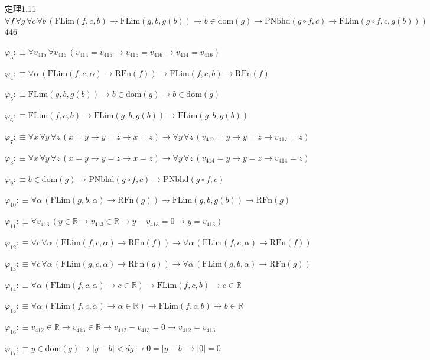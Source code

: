 \begin{fullproof}{定理1.11}{$\forall f\,\forall g\,\forall c\,\forall b\,(\mathrm{FLim}(f,c,b) \to \mathrm{FLim}(g,b,g(b)) \to b \in \mathrm{dom}(g) \to \mathrm{PNbhd}(g \circ f,c) \to \mathrm{FLim}(g \circ f,c,g(b)))$}{446}
\begin{abbrevlist}
\item $\varphi_{3} :\equiv \forall v_{415}\,\forall v_{416}\,(v_{414} = v_{415} \to v_{415} = v_{416} \to v_{414} = v_{416})$
\item $\varphi_{4} :\equiv \forall \alpha\,(\mathrm{FLim}(f,c,\alpha) \to \mathrm{RFn}(f)) \to \mathrm{FLim}(f,c,b) \to \mathrm{RFn}(f)$
\item $\varphi_{5} :\equiv \mathrm{FLim}(g,b,g(b)) \to b \in \mathrm{dom}(g) \to b \in \mathrm{dom}(g)$
\item $\varphi_{6} :\equiv \mathrm{FLim}(f,c,b) \to \mathrm{FLim}(g,b,g(b)) \to \mathrm{FLim}(g,b,g(b))$
\item $\varphi_{7} :\equiv \forall x\,\forall y\,\forall z\,(x = y \to y = z \to x = z) \to \forall y\,\forall z\,(v_{417} = y \to y = z \to v_{417} = z)$
\item $\varphi_{8} :\equiv \forall x\,\forall y\,\forall z\,(x = y \to y = z \to x = z) \to \forall y\,\forall z\,(v_{414} = y \to y = z \to v_{414} = z)$
\item $\varphi_{9} :\equiv b \in \mathrm{dom}(g) \to \mathrm{PNbhd}(g \circ f,c) \to \mathrm{PNbhd}(g \circ f,c)$
\item $\varphi_{10} :\equiv \forall \alpha\,(\mathrm{FLim}(g,b,\alpha) \to \mathrm{RFn}(g)) \to \mathrm{FLim}(g,b,g(b)) \to \mathrm{RFn}(g)$
\item $\varphi_{11} :\equiv \forall v_{413}\,(y \in \mathbb{R} \to v_{413} \in \mathbb{R} \to y - v_{413} = 0 \to y = v_{413})$
\item $\varphi_{12} :\equiv \forall c\,\forall \alpha\,(\mathrm{FLim}(f,c,\alpha) \to \mathrm{RFn}(f)) \to \forall \alpha\,(\mathrm{FLim}(f,c,\alpha) \to \mathrm{RFn}(f))$
\item $\varphi_{13} :\equiv \forall c\,\forall \alpha\,(\mathrm{FLim}(g,c,\alpha) \to \mathrm{RFn}(g)) \to \forall \alpha\,(\mathrm{FLim}(g,b,\alpha) \to \mathrm{RFn}(g))$
\item $\varphi_{14} :\equiv \forall \alpha\,(\mathrm{FLim}(f,c,\alpha) \to c \in \mathbb{R}) \to \mathrm{FLim}(f,c,b) \to c \in \mathbb{R}$
\item $\varphi_{15} :\equiv \forall \alpha\,(\mathrm{FLim}(f,c,\alpha) \to \alpha \in \mathbb{R}) \to \mathrm{FLim}(f,c,b) \to b \in \mathbb{R}$
\item $\varphi_{16} :\equiv v_{412} \in \mathbb{R} \to v_{413} \in \mathbb{R} \to v_{412} - v_{413} = 0 \to v_{412} = v_{413}$
\item $\varphi_{17} :\equiv y \in \mathrm{dom}(g) \to \lvert y - b \rvert < \mathit{dg} \to 0 = \lvert y - b \rvert \to \lvert 0 \rvert = 0$

\end{abbrevlist}
\end{fullproof}
